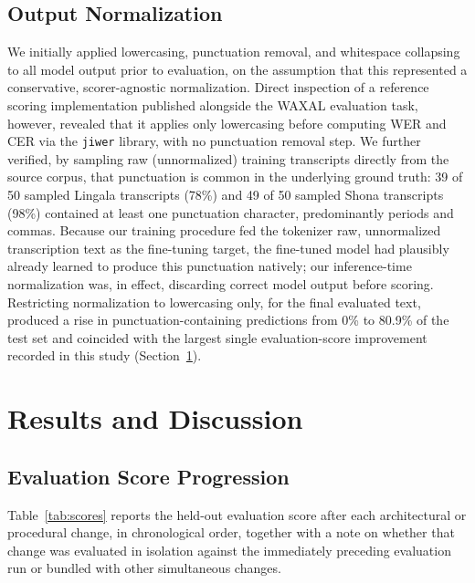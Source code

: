 \documentclass[11pt]{article}
\begin{document}
\subsection{Output Normalization}
\label{sec:normalization}

We initially applied lowercasing, punctuation removal, and whitespace collapsing to all model output prior to evaluation, on the assumption that this represented a conservative, scorer-agnostic normalization. Direct inspection of a reference scoring implementation published alongside the WAXAL evaluation task, however, revealed that it applies only lowercasing before computing WER and CER via the \texttt{jiwer} library, with no punctuation removal step. We further verified, by sampling raw (unnormalized) training transcripts directly from the source corpus, that punctuation is common in the underlying ground truth: 39 of 50 sampled Lingala transcripts (78\%) and 49 of 50 sampled Shona transcripts (98\%) contained at least one punctuation character, predominantly periods and commas. Because our training procedure fed the tokenizer raw, unnormalized transcription text as the fine-tuning target, the fine-tuned model had plausibly already learned to produce this punctuation natively; our inference-time normalization was, in effect, discarding correct model output before scoring. Restricting normalization to lowercasing only, for the final evaluated text, produced a rise in punctuation-containing predictions from 0\% to 80.9\% of the test set and coincided with the largest single evaluation-score improvement recorded in this study (Section~\ref{sec:results}).

\section{Results and Discussion}
\label{sec:results}

\subsection{Evaluation Score Progression}

Table~\ref{tab:scores} reports the held-out evaluation score after each architectural or procedural change, in chronological order, together with a note on whether that change was evaluated in isolation against the immediately preceding evaluation run or bundled with other simultaneous changes.
\end{document}
